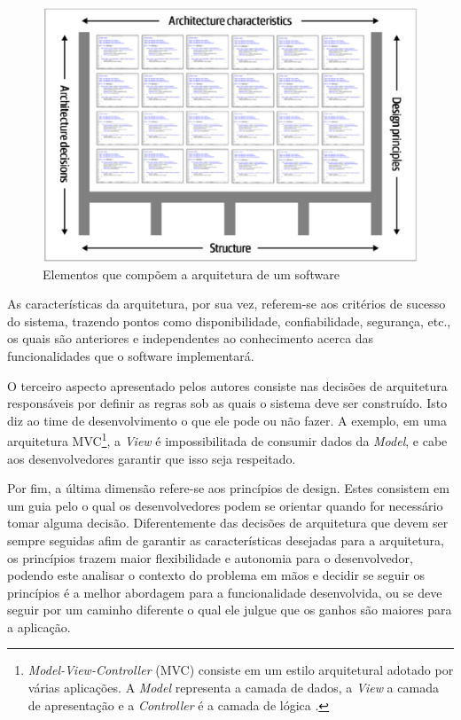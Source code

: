 \begin{figure}[h]
  \centering
  \includegraphics[keepaspectratio=true,scale=0.6]{figuras/richardsAndFord-architectureDefinition.eps}
  \caption{Elementos que compõem a arquitetura de um software\label{fig:ArchitectureDefinition} }
\end{figure}

As características da arquitetura, por sua vez, referem-se aos critérios de sucesso do sistema,
trazendo pontos como disponibilidade, confiabilidade, segurança, etc., os quais são anteriores e
independentes ao conhecimento acerca das funcionalidades que o software implementará.

O terceiro aspecto apresentado pelos autores consiste nas decisões de arquitetura responsáveis por definir
as regras sob as quais o sistema deve ser construído. Isto diz ao time de desenvolvimento o que ele
pode ou não fazer. A exemplo, em uma arquitetura \gls{MVC}\footnote{\textit{Model-View-Controller} (MVC)
consiste em um estilo arquitetural adotado por várias aplicações. A \textit{Model} representa a
camada de dados, a \textit{View} a camada de apresentação e a \textit{Controller} é a camada de
lógica \cite{mcgovern2004practical}.}, a \textit{View} é
impossibilitada de consumir dados da \textit{Model}, e cabe aos desenvolvedores garantir que isso
seja respeitado.

Por fim, a última dimensão refere-se aos princípios de design. Estes consistem em um guia pelo o qual
os desenvolvedores podem se orientar quando for necessário tomar alguma decisão. Diferentemente das
decisões de arquitetura que devem ser sempre seguidas afim de  garantir as características desejadas
para a arquitetura, os princípios trazem maior flexibilidade e autonomia para o desenvolvedor, podendo
este analisar o contexto do problema em mãos e decidir se seguir os princípios é a melhor abordagem
para a funcionalidade desenvolvida, ou se deve seguir por um caminho diferente o qual ele julgue que
os ganhos são maiores para a aplicação.

